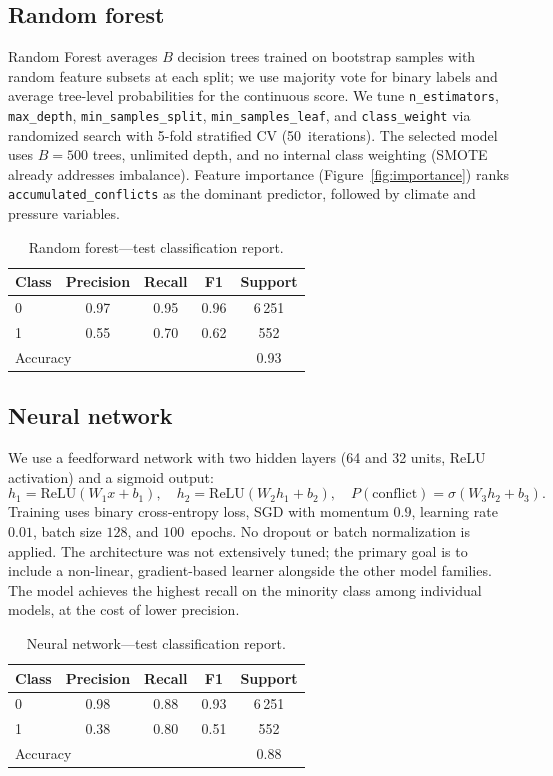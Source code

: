 \documentclass[11pt,a4paper]{article}
\begin{document}
\subsection{Random forest}
Random Forest \parencite{breiman2001random} averages $B$ decision trees trained on bootstrap samples with random feature subsets at each split; we use majority vote for binary labels and average tree-level probabilities for the continuous score. We tune \texttt{n\_estimators}, \texttt{max\_depth}, \texttt{min\_samples\_split}, \texttt{min\_samples\_leaf}, and \texttt{class\_weight} via randomized search with 5-fold stratified CV (50~iterations). The selected model uses $B=500$ trees, unlimited depth, and no internal class weighting (SMOTE already addresses imbalance). Feature importance (Figure~\ref{fig:importance}) ranks \texttt{accumulated\_conflicts} as the dominant predictor, followed by climate and pressure variables.

\begin{table}[H]
  \centering
  \small
  \caption{Random forest---test classification report.}
  \begin{tabular}{lcccc}
    \toprule
    Class & Precision & Recall & F1 & Support \\
    \midrule
    0 & 0.97 & 0.95 & 0.96 & 6\,251 \\
    1 & 0.55 & 0.70 & 0.62 & 552 \\
    \midrule
    \multicolumn{4}{l}{Accuracy} & 0.93 \\
    \bottomrule
  \end{tabular}
\end{table}

\subsection{Neural network}
We use a feedforward network with two hidden layers (64 and 32 units, ReLU activation) and a sigmoid output:
\[
h_1 = \mathrm{ReLU}(W_1 x + b_1),\quad
h_2 = \mathrm{ReLU}(W_2 h_1 + b_2),\quad
P(\mathrm{conflict}) = \sigma(W_3 h_2 + b_3).
\]
Training uses binary cross-entropy loss, SGD with momentum $0.9$, learning rate $0.01$, batch size $128$, and $100$~epochs. No dropout or batch normalization is applied. The architecture was not extensively tuned; the primary goal is to include a non-linear, gradient-based learner alongside the other model families. The model achieves the highest recall on the minority class among individual models, at the cost of lower precision.

\begin{table}[H]
  \centering
  \small
  \caption{Neural network---test classification report.}
  \begin{tabular}{lcccc}
    \toprule
    Class & Precision & Recall & F1 & Support \\
    \midrule
    0 & 0.98 & 0.88 & 0.93 & 6\,251 \\
    1 & 0.38 & 0.80 & 0.51 & 552 \\
    \midrule
    \multicolumn{4}{l}{Accuracy} & 0.88 \\
    \bottomrule
  \end{tabular}
\end{table}
\end{document}

